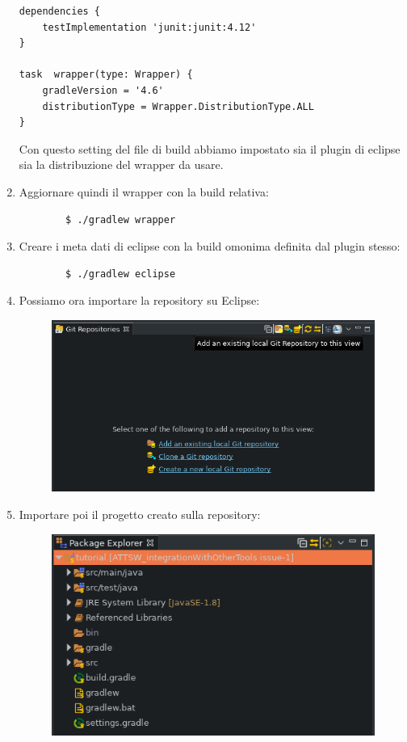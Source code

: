 \begin{enumerate}
\begin{lstlisting}[frame=single]
dependencies {
    testImplementation 'junit:junit:4.12'
}

task  wrapper(type: Wrapper) {
    gradleVersion = '4.6'
    distributionType = Wrapper.DistributionType.ALL
}
    \end{lstlisting}
    Con questo setting del file di build abbiamo impostato sia il plugin di eclipse sia la distribuzione del wrapper da usare.
    \item Aggiornare quindi il wrapper con la build relativa:
    \begin{verbatim}
        $ ./gradlew wrapper
    \end{verbatim}
    \item Creare i meta dati di eclipse con la build omonima definita dal plugin stesso:
    \begin{verbatim}
        $ ./gradlew eclipse
    \end{verbatim}
    \item Possiamo ora importare la repository su Eclipse:
    \begin{figure}[H]
    \centering
    \includegraphics[width=0.8\linewidth]{4IntegrationWithOtherTool/tutorial/addExistingLocalGitRepository.png}
    \end{figure}
    \item Importare poi il progetto creato sulla repository:
    \begin{figure}[H]
    \centering
    \includegraphics[width=0.8\linewidth]{4IntegrationWithOtherTool/tutorial/localRepositoryEclipse.png}

\end{figure}
\end{enumerate}
